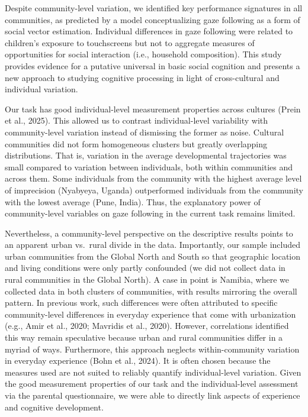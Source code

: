 \documentclass[
  man,floatsintext]{apa7}
\begin{document}
Despite community-level variation, we identified key performance signatures in all communities, as predicted by a model conceptualizing gaze following as a form of social vector estimation. Individual differences in gaze following were related to children's exposure to touchscreens but not to aggregate measures of opportunities for social interaction (i.e., household composition). This study provides evidence for a putative universal in basic social cognition and presents a new approach to studying cognitive processing in light of cross-cultural and individual variation.

Our task has good individual-level measurement properties across cultures (Prein et al., 2025). This allowed us to contrast individual-level variability with community-level variation instead of dismissing the former as noise. Cultural communities did not form homogeneous clusters but greatly overlapping distributions. That is, variation in the average developmental trajectories was small compared to variation between individuals, both within communities and across them. Some individuals from the community with the highest average level of imprecision (Nyabyeya, Uganda) outperformed individuals from the community with the lowest average (Pune, India). Thus, the explanatory power of community-level variables on gaze following in the current task remains limited.

Nevertheless, a community-level perspective on the descriptive results points to an apparent urban vs.~rural divide in the data. Importantly, our sample included urban communities from the Global North and South so that geographic location and living conditions were only partly confounded (we did not collect data in rural communities in the Global North). A case in point is Namibia, where we collected data in both clusters of communities, with results mirroring the overall pattern. In previous work, such differences were often attributed to specific community-level differences in everyday experience that come with urbanization (e.g., Amir et al., 2020; Mavridis et al., 2020). However, correlations identified this way remain speculative because urban and rural communities differ in a myriad of ways. Furthermore, this approach neglects within-community variation in everyday experience (Bohn et al., 2024). It is often chosen because the measures used are not suited to reliably quantify individual-level variation. Given the good measurement properties of our task and the individual-level assessment via the parental questionnaire, we were able to directly link aspects of experience and cognitive development.
\end{document}
